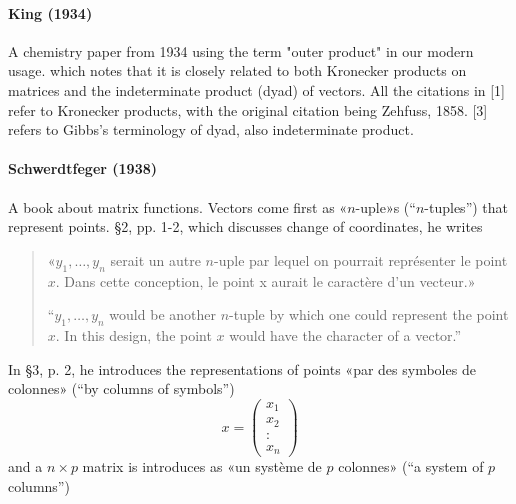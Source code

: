 \paragraph{King (1934)}

A chemistry paper from 1934 using the term "outer product" in
our modern usage. which notes that it is closely related to both Kronecker products on
matrices and the indeterminate product (dyad) of vectors. All the
citations in [1] refer to Kronecker products, with the original
citation being Zehfuss, 1858. [3] refers to Gibbs's terminology of
dyad, also indeterminate product.

\paragraph{Schwerdtfeger (1938)~\cite{Schwerdtfeger1938}}

A book about matrix functions.
Vectors come first as «$n$-uple»s (``$n$-tuples'') that represent points. \S 2, pp. 1-2, which discusses change of coordinates, he writes
\begin{quote}
«$y_1, \dots, y_n$ serait un autre $n$-uple par lequel on pourrait représenter le point $x$. Dans cette conception, le point x aurait le caractère d'un vecteur.»

``$y_1, \dots, y_n$ would be another $n$-tuple by which one could represent the point $x$. In this design, the point $x$ would have the character of a vector.''
\end{quote}

In \S 3, p. 2, he introduces the representations of points «par des symboles de colonnes» (``by columns of symbols'')
\[
x =\begin{pmatrix}x_1\\x_2\\:\\x_n\end{pmatrix}
\]
and a $n \times p$ matrix is introduces as «un système de $p$ colonnes» (``a system of $p$ columns'')

